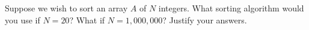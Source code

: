 Suppose we wish to sort an array $A$ of $N$ integers.  What sorting
algorithm would you use if $N=20$?  What if $N=1,000,000$?  Justify
your answers.
